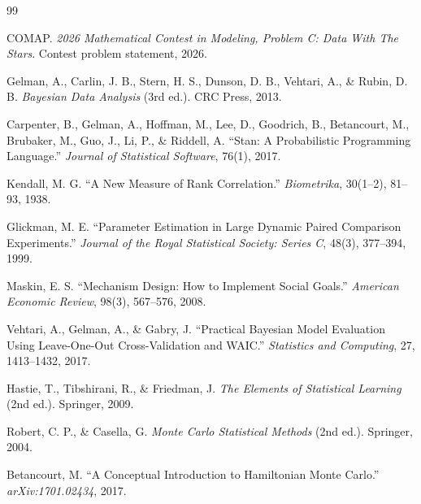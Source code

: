 \documentclass{article}
\begin{document}
\begin{thebibliography}{99}

COMAP. \emph{2026 Mathematical Contest in Modeling, Problem C: Data With The Stars}. Contest problem statement, 2026.

Gelman, A., Carlin, J. B., Stern, H. S., Dunson, D. B., Vehtari, A., \& Rubin, D. B. \emph{Bayesian Data Analysis} (3rd ed.). CRC Press, 2013.

Carpenter, B., Gelman, A., Hoffman, M., Lee, D., Goodrich, B., Betancourt, M., Brubaker, M., Guo, J., Li, P., \& Riddell, A. ``Stan: A Probabilistic Programming Language.'' \emph{Journal of Statistical Software}, 76(1), 2017.

Kendall, M. G. ``A New Measure of Rank Correlation.'' \emph{Biometrika}, 30(1--2), 81--93, 1938.

Glickman, M. E. ``Parameter Estimation in Large Dynamic Paired Comparison Experiments.'' \emph{Journal of the Royal Statistical Society: Series C}, 48(3), 377--394, 1999.

Maskin, E. S. ``Mechanism Design: How to Implement Social Goals.'' \emph{American Economic Review}, 98(3), 567--576, 2008.

Vehtari, A., Gelman, A., \& Gabry, J. ``Practical Bayesian Model Evaluation Using Leave-One-Out Cross-Validation and WAIC.'' \emph{Statistics and Computing}, 27, 1413--1432, 2017.

Hastie, T., Tibshirani, R., \& Friedman, J. \emph{The Elements of Statistical Learning} (2nd ed.). Springer, 2009.

Robert, C. P., \& Casella, G. \emph{Monte Carlo Statistical Methods} (2nd ed.). Springer, 2004.

Betancourt, M. ``A Conceptual Introduction to Hamiltonian Monte Carlo.'' \emph{arXiv:1701.02434}, 2017.

\end{thebibliography}
\end{document}
